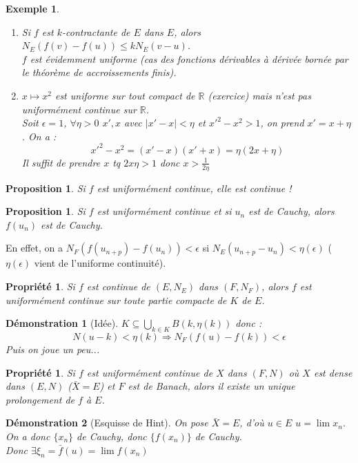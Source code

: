 \documentclass[a4paper, oneside]{report}
\theoremstyle{break}
\newtheorem{propr}[thm]{Propriété}
\newtheorem{propo}[thm]{Proposition}
\newtheorem{exem}[thm]{Exemple}
\newtheorem*{demo}{Démonstration}
\newcommand{\R}{\mathbb{R}}
\newcommand{\unifcont}{uniformément continue }
\newcommand{\fracun}[1]{\frac{1}{#1}}
\begin{document}
\begin{exem}
\begin{enumerate}
\item Si $f$ est $k$-contractante de $E$ dans $E$, alors $N_E(f(v)-f(u))\leq k N_E(v-u)$.\\
$f$ est évidemment uniforme (cas des fonctions dérivables à dérivée bornée par le théorème de accroissements finis).

\item $x\mapsto x^2$ est uniforme sur tout compact de $\R$ (exercice) mais n'est pas uniformément continue sur $\R$.\\
Soit $\epsilon = 1$, $\forall \eta>0$ $x',x$ avec $|x'-x|<\eta$ et $x'^2-x^2>1$, on prend $x' = x+\eta $. On a :
$$x'^2-x^2=(x'-x)(x'+x)=\eta (2x+\eta)$$
Il suffit de prendre $x$ tq $2x\eta >1$ donc $x>\fracun{2\eta}$
\end{enumerate}
\end{exem}

\begin{propo}
Si $f$ est uniformément continue, elle est continue !
\end{propo}

\begin{propo}
Si $f$ est uniformément continue et si $u_n$ est de Cauchy, alors $f(u_n)$ est de Cauchy.
\end{propo}

En effet, on a $N_F(f(u_{n+p})-f(u_n))<\epsilon$ si $N_E(u_{n+p}-u_n)<\eta(\epsilon)$ ($\eta(\epsilon)$ vient de l'uniforme continuité).

\begin{propr}
Si $f$ est continue de $(E,N_E)$ dans $(F,N_F)$, alors $f$ est uniformément continue sur toute partie compacte de $K$ de $E$.
\end{propr}

\begin{demo}[Idée]
$K\subseteq \bigcup_{k \in K}B(k,\eta(k))$ donc :
$$N(u-k)<\eta(k) \Rightarrow N_F(f(u)-f(k))<\epsilon$$
Puis on joue un peu...
\end{demo}

\begin{propr}
Si $f$ est \unifcont de $X$ dans $(F,N)$ où $X$ est dense dans $(E,N)$ ($\bar{X}=E$) et $F$ est de Banach, alors il existe un unique prolongement de $f$ à $E$.
\end{propr}

\begin{demo}[Esquisse de Hint]
On pose $\bar{X}=E$, d'où $u\in E$ $u=\lim x_n$.
On a donc $\{x_n\}$ de Cauchy, donc $\{f(x_n)\}$ de Cauchy.\\
Donc $\exists \xi_n=\bar{f}(u)=\lim f(x_n)$
\end{demo}
\end{document}
